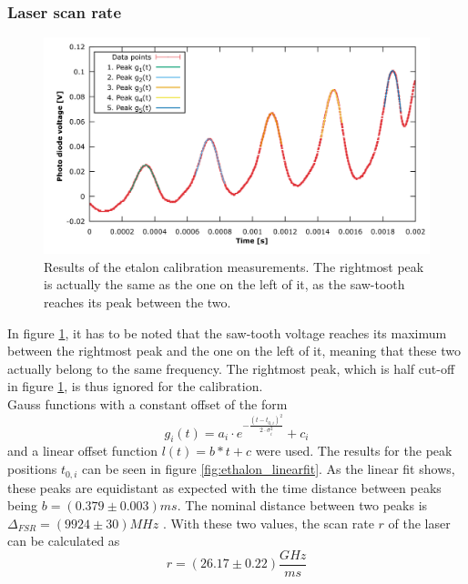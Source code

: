 \subsubsection*{Laser scan rate}
\begin{figure}[htb]
\centering
\includegraphics[width=1.0\linewidth]{graphics/etalon_fit}
\caption[Etalon peaks]{Results of the etalon calibration measurements. The rightmost peak is actually the same as the one on the left of it, as the saw-tooth reaches its peak between the two.}
\label{fig:etalon_fit}
\end{figure}
In figure \ref{fig:etalon_fit}, it has to be noted that the saw-tooth voltage reaches its maximum between the rightmost peak and the one on the left of it, meaning that these two actually belong to the same frequency. The rightmost peak, which is half cut-off in figure \ref{fig:etalon_fit}, is thus ignored for the calibration.\\
Gauss functions with a constant offset of the form
\begin{equation}
	g_i(t)=a_i\cdot e^{-\frac{(t-t_{0,i})^2}{2\cdot\sigma_i^2}}+c_i
	\label{eq:gaussfit}
\end{equation}
and a linear offset function $l(t)=b*t+c$ were used. 
The results for the peak positions $t_{0,i}$ can be seen in figure \ref{fig:ethalon_linearfit}. As the linear fit shows, these peaks are equidistant as expected with the time distance between peaks being $b=\unit{(0.379\pm0.003)}{ms}$. The nominal distance between two peaks is $\Delta_{FSR}=\unit{(9924\pm30)}{MHz}$ \cite{anleitung}. With these two values, the scan rate $r$ of the laser can be calculated as
\begin{equation}
	r=\unit{(26.17\pm 0.22)}{\frac{GHz}{ms}}
\end{equation}

